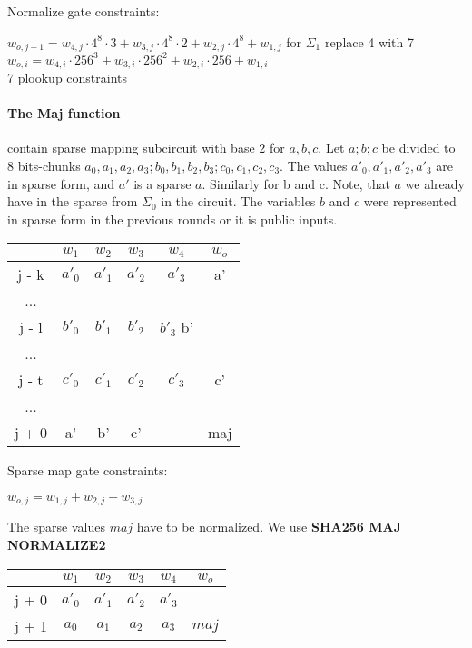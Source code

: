 Normalize gate constraints:
\begin{center}
$w_{o,j-1} = w_{4,j} \cdot 4^8 \cdot 3 + w_{3,j} \cdot 4^8 \cdot 2 + w_{2,j} \cdot 4^8 + w_{1,j}$ for $\Sigma_1$ replace 4 with 7\\
$w_{o,i} = w_{4,i} \cdot 256^3 + w_{3,i} \cdot 256^2 + w_{2,i} \cdot 256 + w_{1,i}$ \\
7 plookup constraints \\
\end{center}

\paragraph{The Maj function}
contain sparse mapping subcircuit with base $2$ for $a, b ,c$.
Let $a; b; c$ be divided to 8 bits-chunks $a_0, a_1, a_2, a_3; b_0, b_1, b_2, b_3; c_0, c_1, c_2, c_3$.
The values $a'_0, a'_1, a'_2, a'_3$ are in sparse form, and $a'$ is a sparse $a$.
Similarly for b and c. 
Note, that $a$ we already have in the sparse from $\Sigma_0$ in the circuit. 
The variables $b$ and $c$ were represented in sparse form in the previous rounds or it is public inputs.
\begin{center}
\begin{tabular}{ c|c|c|c|c|c } 
  & $w_1$ & $w_2$ & $w_3$ & $w_4$ & $w_o$\\ 
 \hline 
j - k & $a'_0$ & $a'_1$ & $a'_2$ & $a'_3$ & a' \\ 
... & & & & \\
j - l & $b'_0$ & $b'_1$ & $b'_2$ & $b'_3$ b'&\\ 
... & & & & \\
j - t & $c'_0$ & $c'_1$ & $c'_2$ & $c'_3$ & c' \\ 
... & & & & \\
j + 0 & a' & b' & c' & & maj \\
\end{tabular}
\end{center}
Sparse map gate constraints:
\begin{center}
$w_{o, j} = w_{1,j} + w_{2, j} + w_{3, j}$ \\
\end{center}

The sparse values $maj$ have to be normalized.
We use \textbf{SHA256 MAJ NORMALIZE2}
\begin{center}
\begin{tabular}{ c|c|c|c|c|c } 
  & $w_1$ & $w_2$ & $w_3$ & $w_4$ & $w_o$\\ 
 \hline
j + 0 & $a'_0$ & $a'_1$ & $a'_2$ & $a'_3$ &\\ 
j + 1 & $a_0$ & $ a_1$ & $a_2$ & $a_3$ &  $maj$ \\ 
\end{tabular}
\end{center}

